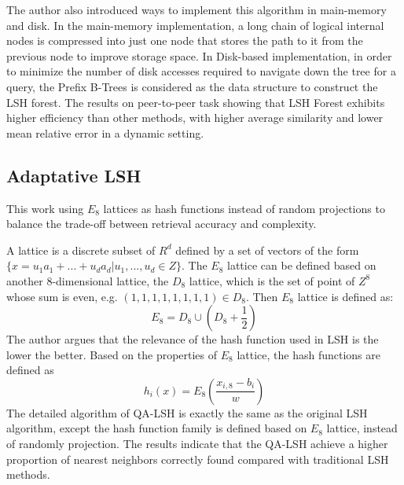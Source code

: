The author also introduced ways to implement this algorithm in main-memory and disk. In the main-memory implementation, a long chain of logical internal nodes is compressed into just one node that stores the path to it from the previous node to improve storage space. In Disk-based implementation, in order to minimize the number of disk accesses required to navigate down the tree for a query, the Prefix B-Trees is considered as the data structure to construct the LSH forest. The results on peer-to-peer task showing that LSH Forest exhibits higher efficiency than other methods, with higher average similarity and lower mean relative error in a dynamic setting.
\subsection{Adaptative LSH}
This work \cite{jegou2008query} using $E_8$ lattices as hash functions instead of random projections to balance the trade-off between retrieval accuracy and complexity.

A lattice is a discrete subset of $R^d$ defined by a set of vectors of the form $\{x=u_1a_1+...+u_da_d|u_1, ..., u_d\in Z\}$. The $E_8$ lattice can be defined based on another 8-dimensional lattice, the $D_8$ lattice, which is the set of point of $Z^8$ whose sum is even, e.g. $(1,1,1,1,1,1,1,1)\in D_8$. Then $E_8$ lattice is defined as:
$$E_8=D_8\cup (D_8+\frac{1}{2})$$
The author argues that the relevance of the hash function used in LSH is the lower the better. Based on the properties of $E_8$ lattice, the hash functions are defined as $$h_i(x)=E_8(\frac{x_{i,8}-b_i}{w})$$ The detailed algorithm of QA-LSH is exactly the same as the original LSH algorithm, except the hash function family is defined based on $E_8$ lattice, instead of randomly projection. The results indicate that the QA-LSH achieve a higher proportion of nearest neighbors correctly found compared with traditional LSH methods. 



